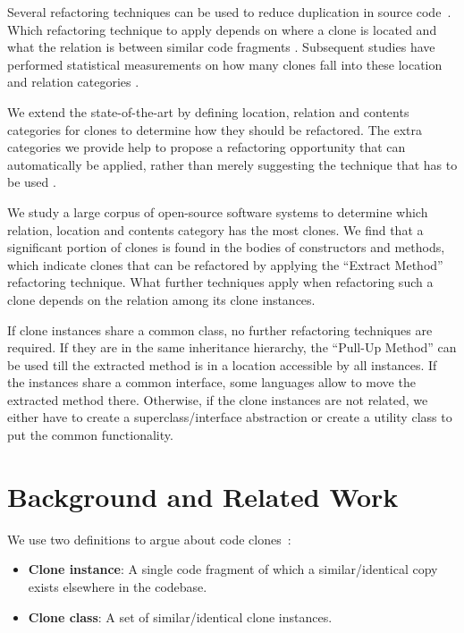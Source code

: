 \documentclass[runningheads]{llncs}
\begin{document}
Several refactoring techniques can be used to reduce duplication in source code~\cite{fowler2018refactoring}. Which refactoring technique to apply depends on where a clone is located and what the relation is between similar code fragments \cite{koni2001scenario}. Subsequent studies have performed statistical measurements on how many clones fall into these location and relation categories \cite{fontana2012duplicated, fontana2015duplicated}.

We extend the state-of-the-art \cite{fontana2015duplicated} by defining location, relation and contents categories for clones to determine how they should be refactored. The extra categories we provide help to propose a refactoring opportunity that can automatically be applied, rather than merely suggesting the technique that has to be used \cite{fontana2015duplicated}.

We study a large corpus of open-source software systems to determine which relation, location and contents category has the most clones. We find that a significant portion of clones is found in the bodies of constructors and methods, which indicate clones that can be refactored by applying the ``Extract Method'' refactoring technique. What further techniques apply when refactoring such a clone depends on the relation among its clone instances.

If clone instances share a common class, no further refactoring techniques are required. If they are in the same inheritance hierarchy, the ``Pull-Up Method'' can be used till the extracted method is in a location accessible by all instances. If the instances share a common interface, some languages allow to move the extracted method there. Otherwise, if the clone instances are not related, we either have to create a superclass/interface abstraction or create a utility class to put the common functionality.

\section{Background and Related Work}
We use two definitions to argue about code clones~\cite{roy2007survey}:
\begin{itemize}
    \item \textbf{Clone instance}: A single code fragment of which a similar/identical copy exists elsewhere in the codebase.
    \item \textbf{Clone class}: A set of similar/identical clone instances.
\end{itemize}
\end{document}
